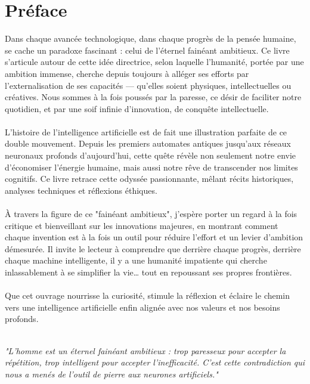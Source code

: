 \documentclass[12pt,a4paper]{book}
\begin{document}
\newpage
\pagestyle{empty}
\chapter*{Préface}

Dans chaque avancée technologique, dans chaque progrès de la pensée humaine, se cache un paradoxe fascinant : celui de l'éternel fainéant ambitieux. Ce livre s'articule autour de cette idée directrice, selon laquelle l'humanité, portée par une ambition immense, cherche depuis toujours à alléger ses efforts par l'externalisation de ses capacités — qu'elles soient physiques, intellectuelles ou créatives. Nous sommes à la fois poussés par la paresse, ce désir de faciliter notre quotidien, et par une soif infinie d'innovation, de conquête intellectuelle.
\\ \\
L'histoire de l'intelligence artificielle est de fait une illustration parfaite de ce double mouvement. Depuis les premiers automates antiques jusqu'aux réseaux neuronaux profonds d'aujourd'hui, cette quête révèle non seulement notre envie d'économiser l'énergie humaine, mais aussi notre rêve de transcender nos limites cognitifs. Ce livre retrace cette odyssée passionnante, mêlant récits historiques, analyses techniques et réflexions éthiques.
\\ \\
À travers la figure de ce "fainéant ambitieux", j'espère porter un regard à la fois critique et bienveillant sur les innovations majeures, en montrant comment chaque invention est à la fois un outil pour réduire l'effort et un levier d'ambition démesurée. Il invite le lecteur à comprendre que derrière chaque progrès, derrière chaque machine intelligente, il y a une humanité impatiente qui cherche inlassablement à se simplifier la vie… tout en repoussant ses propres frontières.
\\ \\
Que cet ouvrage nourrisse la curiosité, stimule la réflexion et éclaire le chemin vers une intelligence artificielle enfin alignée avec nos valeurs et nos besoins profonds.
\\ \\
\begin{citationmd}
\centering\itshape\large
"L'homme est un éternel fainéant ambitieux : trop paresseux pour accepter la répétition, trop intelligent pour accepter l'inefficacité. C'est cette contradiction qui nous a menés de l'outil de pierre aux neurones artificiels."
\end{citationmd}
\end{document}

